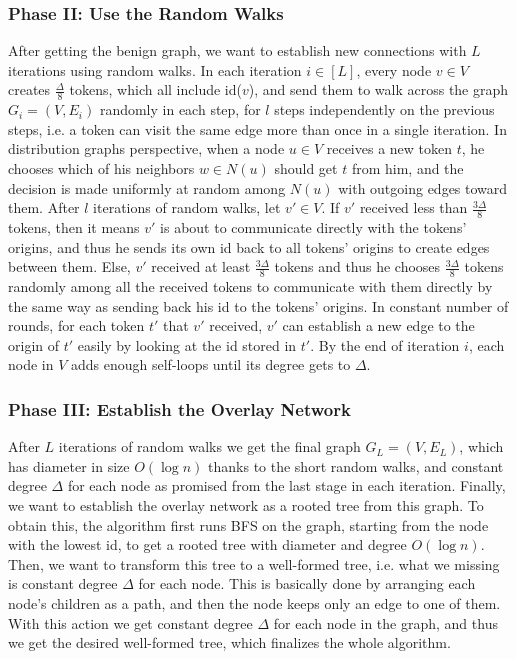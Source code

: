 \documentclass[11pt]{article}
\begin{document}
\subsubsection{Phase II: Use the Random Walks}
After getting the benign graph, we want to establish new connections with $L$ iterations using random walks. In each iteration $i\in[L]$, every node $v\in V$ creates $\frac{\Delta}{8}$ tokens, which all include id($v$), and send them to walk across the graph $G_{i}=(V,E_{i})$ randomly in each step, for $l$ steps independently on the previous steps, i.e. a token can visit the same edge more than once in a single iteration. In distribution graphs perspective, when a node $u \in V$ receives a new token $t$, he chooses which of his neighbors $w \in N(u)$ should get $t$ from him, and the decision is made uniformly at random among $N(u)$ with outgoing edges toward them. After $l$ iterations of random walks, let $v' \in V$. If $v'$ received less than $\frac{3\Delta}{8}$ tokens, then it means $v'$ is about to communicate directly with the tokens' origins, and thus he sends its own id back to all tokens' origins to create edges between them. Else, $v'$ received at least $\frac{3\Delta}{8}$ tokens and thus he chooses $\frac{3\Delta}{8}$ tokens randomly among all the received tokens to communicate with them directly by the same way as sending back his id to the tokens' origins. In constant number of rounds, for each token $t'$ that $v'$ received, $v'$ can establish a new edge to the origin of $t'$ easily by looking at the id stored in $t'$. By the end of iteration $i$, each node in $V$ adds enough self-loops until its degree gets to $\Delta$.

\subsubsection{Phase III: Establish the Overlay Network}
After $L$ iterations of random walks we get the final graph $G_{L}=(V,E_{L})$, which has diameter in size $O(\log{n})$ thanks to the short random walks, and constant degree $\Delta$ for each node as promised from the last stage in each iteration. Finally, we want to establish the overlay network as a rooted tree from this graph. To obtain this, the algorithm first runs BFS on the graph, starting from the node with the lowest id, to get a rooted tree with diameter and degree $O(\log{n})$. Then, we want to transform this tree to a well-formed tree, i.e. what we missing is constant degree $\Delta$ for each node. This is basically done by arranging each node's children as a path, and then the node keeps only an edge to one of them. With this action we get constant degree $\Delta$ for each node in the graph, and thus we get the desired well-formed tree, which finalizes the whole algorithm.
\end{document}

